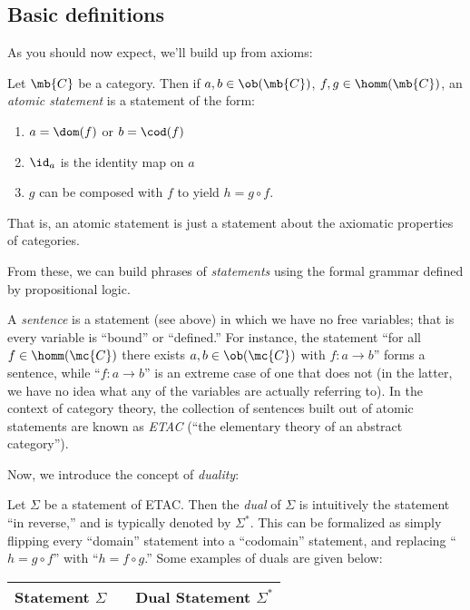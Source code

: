 \documentclass[nocover]{pset}
\begin{document}
\begin{adjustwidth}{1em}{1em}
  \subsection{Basic definitions}
  As you should now expect, we'll build up from axioms:
  \begin{definition}
    Let $\mb{C}$ be a category. Then if $a,b \in \ob(\mb{C})$, $f,g
    \in \homm(\mb{C})$, an \emph{atomic statement} is a statement of
    the form:
    \begin{enumerate}
      \item $a = \dom(f)$ or $b = \cod(f)$
      \item $\id_a$ is the identity map on $a$
      \item $g$ can be composed with $f$ to yield $h = g \circ f$.
    \end{enumerate}
    That is, an atomic statement is just a statement about the
    axiomatic properties of categories.
  \end{definition}
  From these, we can build phrases of \emph{statements} using the
  formal grammar defined by propositional logic.
  \begin{definition}[Sentences]
    A \emph{sentence} is a statement (see above) in which we have no
    free variables; that is every variable is ``bound'' or
    ``defined.'' For instance, the statement ``for all $f \in
    \homm(\mc{C})$ there exists $a,b \in \ob(\mc{C})$ with $f : a \to
    b$'' forms a sentence, while ``$f : a \to b$'' is an extreme case
    of one that does not (in the latter, we have no idea what any of
    the variables are actually referring to). In the context of
    category theory, the collection of sentences built out of atomic
    statements are known as \emph{ETAC} (``the elementary theory of an
    abstract category'').
  \end{definition}
  Now, we introduce the concept of \emph{duality}:
  \begin{definition}[Duality]
    Let $\Sigma$ be a statement of ETAC. Then the \emph{dual} of
    $\Sigma$ is intuitively the statement ``in reverse,'' and is
    typically denoted by $\Sigma^*$. This can be formalized as simply
    flipping every ``domain'' statement into a ``codomain'' statement,
    and replacing ``$h = g \circ f$'' with ``$h = f \circ g$.'' Some
    examples of duals are given below:
    \begin{table}[H]
      \centering
      \begin{tabular}{@{}lll@{}}
        \toprule
        Statement $\Sigma$ && Dual Statement $\Sigma^*$ \\ \midrule

\end{tabular}
\end{table}
\end{definition}
\end{adjustwidth}
\end{document}
